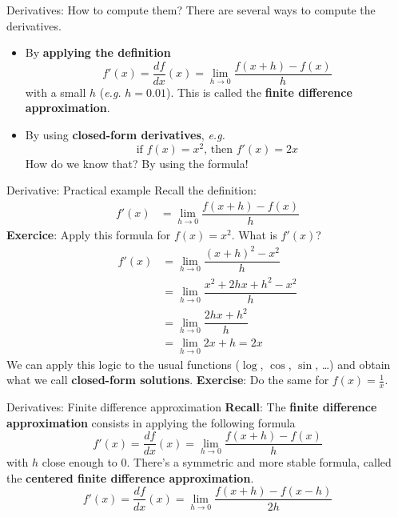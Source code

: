 \documentclass{beamer}
\newcommand{\1}[1]{\mathbbm{1}\left[#1\right]}
\begin{document}
\begin{frame}{Derivatives: How to compute them?}
There are several ways to compute the derivatives.
\begin{itemize}
\vfill
\pause
	\item By \textbf{applying the definition}
\begin{equation*}
	f'(x) = \dfrac{df}{dx}(x) = \lim_{h \to 0}\dfrac{f(x + h) - f(x)}{h}
\end{equation*}
	with a small $h$ (\textit{e.g.} $h = 0.01$). This is called the \textbf{finite difference approximation}.
	\item By using \textbf{closed-form derivatives}, \textit{e.g.}
\begin{equation*}
	\text{if } f(x) = x^2 \text{, then } f'(x) = 2x
\end{equation*}
	How do we know that? By using the formula!
\end{itemize}
\end{frame}

\begin{frame}{Derivative: Practical example}
Recall the definition:
\begin{equation*}
\begin{split}
	f'(x) &= \lim_{h \to 0}\dfrac{f(x + h) - f(x)}{h}
\end{split}
\end{equation*}
\textbf{Exercice}: Apply this formula for $f(x) = x^2$. What is $f'(x)$?
\pause
\vfill
\begin{equation*}
\begin{split}
	f'(x) &= \lim_{h \to 0}\dfrac{(x + h)^2 - x^2}{h} \\
	& = \lim_{h \to 0}\dfrac{x^2 + 2hx + h^2 - x^2}{h} \\
	& = \lim_{h \to 0}\dfrac{2hx + h^2}{h} \\
	& = \lim_{h \to 0} 2x + h = 2x
\end{split}
\end{equation*}
We can apply this logic to the usual functions ($\log$, $\cos$, $\sin$, \ldots) and obtain what we call \textbf{closed-form solutions}. 
\vfill
\pause
\textbf{Exercise}: Do the same for $f(x) = \frac{1}{x}$.
\end{frame}

\begin{frame}{Derivatives: Finite difference approximation}
\textbf{Recall}: The \textbf{finite difference approximation} consists in applying the following formula
\begin{equation*}
	f'(x) = \dfrac{df}{dx}(x) = \lim_{h \to 0}\dfrac{f(x + h) - f(x)}{h}
\end{equation*}
with $h$ close enough to $0$.
\pause
\vfill
There's a symmetric and more stable formula, called the \textbf{centered finite difference approximation}.
\begin{equation*}
	f'(x) = \dfrac{df}{dx}(x) = \lim_{h \to 0}\dfrac{f(x + h) - f(x - h)}{2h}
\end{equation*}
\end{frame}
\end{document}
